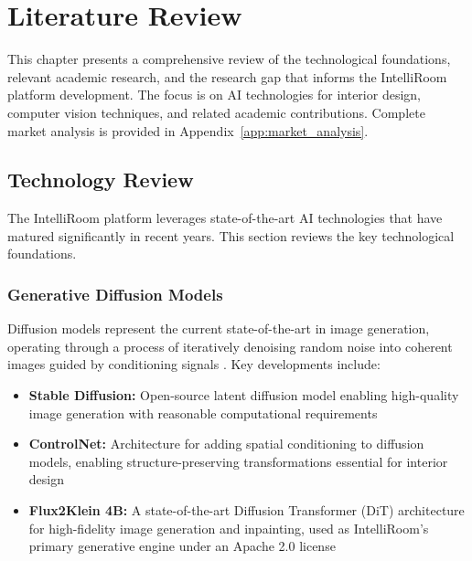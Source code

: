 
\chapter{Literature Review}
\label{chap:literature}

This chapter presents a comprehensive review of the technological foundations, relevant academic research, and the research gap that informs the IntelliRoom platform development. The focus is on AI technologies for interior design, computer vision techniques, and related academic contributions. Complete market analysis is provided in Appendix~\ref{app:market_analysis}.

\section{Technology Review}
\label{sec:technology_review}

The IntelliRoom platform leverages state-of-the-art AI technologies that have matured significantly in recent years. This section reviews the key technological foundations.

\subsection{Generative Diffusion Models}

Diffusion models represent the current state-of-the-art in image generation, operating through a process of iteratively denoising random noise into coherent images guided by conditioning signals \cite{ho2020denoising}. Key developments include:

\begin{itemize}
    \item \textbf{Stable Diffusion:} Open-source latent diffusion model enabling high-quality image generation with reasonable computational requirements \cite{rombach2022highresolution}
    
    \item \textbf{ControlNet:} Architecture for adding spatial conditioning to diffusion models, enabling structure-preserving transformations essential for interior design \cite{zhang2023adding}
    
    \item \textbf{Flux2Klein 4B:} A state-of-the-art Diffusion Transformer (DiT) architecture for high-fidelity image generation and inpainting, used as IntelliRoom's primary generative engine under an Apache 2.0 license \cite{flux2klein2026}
\end{itemize}

